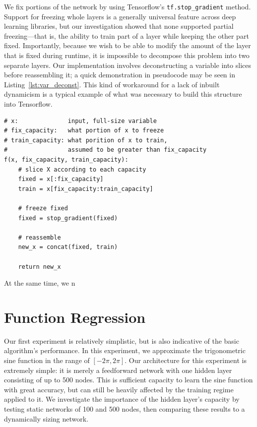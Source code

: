 We fix portions of the network by using Tensorflow's \texttt{tf.stop\_gradient} method.
Support for freezing whole layers is a generally universal feature across deep learning libraries, but our investigation showed that none supported partial freezing---that is, the ability to train part of a layer while keeping the other part fixed.
Importantly, because we wish to be able to modify the amount of the layer that is fixed during runtime, it is impossible to decompose this problem into two separate layers.
Our implementation involves deconstructing a variable into slices before reassembling it; a quick demonstration in pseudocode may be seen in Listing~\ref{lst:var_deconst}.
This kind of workaround for a lack of inbuilt dynamicism is a typical example of what was necessary to build this structure into Tensorflow.

\begin{lstlisting}[caption={Variable Deconstruction}, label={lst:var_deconst}, captionpos=b]
# x:              input, full-size variable
# fix_capacity:   what portion of x to freeze
# train_capacity: what porition of x to train,
#                 assumed to be greater than fix_capacity
f(x, fix_capacity, train_capacity):
    # slice X according to each capacity
    fixed = x[:fix_capacity]
    train = x[fix_capacity:train_capacity]

    # freeze fixed
    fixed = stop_gradient(fixed)

    # reassemble 
    new_x = concat(fixed, train)

    return new_x
\end{lstlisting}

At the same time, we n


\section{Function Regression}
Our first experiment is relatively simplistic, but is also indicative of the basic algorithm's performance.
In this experiment, we approximate the trigonometric sine function in the range of $[-2\pi, 2\pi]$.
Our architecture for this experiment is extremely simple: it is merely a feedforward network with one hidden layer consisting of up to 500 nodes.
This is sufficient capacity to learn the sine function with great accuracy, but can still be heavily affected by the training regime applied to it.
We investigate the importance of the hidden layer's capacity by testing static networks of 100 and 500 nodes, then comparing these results to a dynamically sizing network.

